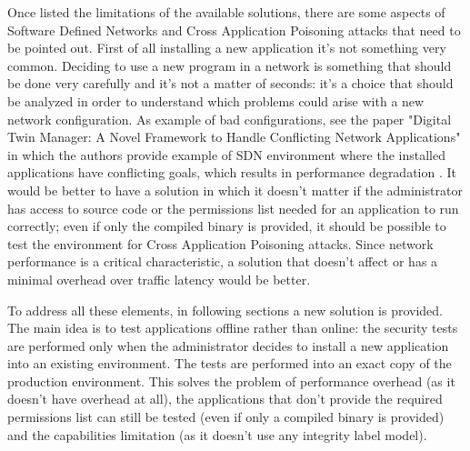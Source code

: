 Once listed the limitations of the available solutions, there are some aspects of Software Defined Networks and Cross Application Poisoning attacks that need to be pointed out. First of all installing a new application it's not something very common. Deciding to use a new program in a network is something that should be done very carefully and it's not a matter of seconds: it's a choice that should be analyzed in order to understand which problems could arise with a new network configuration. As example of bad configurations, see the paper "Digital Twin Manager: A Novel Framework to
Handle Conflicting Network Applications" in which the authors provide example of SDN environment where the installed applications have conflicting goals, which results in performance degradation \cite{dt-manager}. It would be better to have a solution in which it doesn't matter if the administrator has access to source code or the permissions list needed for an application to run correctly; even if only the compiled binary is provided, it should be possible to test the environment for Cross Application Poisoning attacks. Since network performance is a critical characteristic, a solution that doesn't affect or has a minimal overhead over traffic latency would be better.
\medskip

To address all these elements, in following sections a new solution is provided. The main idea is to test applications offline rather than online: the security tests are performed only when the administrator decides to install a new application into an existing environment. The tests are performed into an exact copy of the production environment. This solves the problem of performance overhead (as it doesn't have overhead at all), the applications that don't provide the required permissions list can still be tested (even if only a compiled binary is provided) and the capabilities limitation (as it doesn't use any integrity label model).

\clearpage